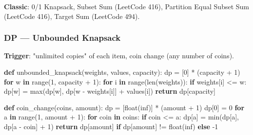 \documentclass[11pt]{article}
\newenvironment{Shaded}{\begin{snugshade}}{\end{snugshade}}
\newcommand{\BuiltInTok}[1]{\textcolor[rgb]{0.50,0.55,0.55}{#1}}
\newcommand{\ControlFlowTok}[1]{\textcolor[rgb]{0.99,0.74,0.29}{\textbf{#1}}}
\newcommand{\DecValTok}[1]{\textcolor[rgb]{0.96,0.45,0.00}{#1}}
\newcommand{\KeywordTok}[1]{\textcolor[rgb]{0.81,0.81,0.76}{\textbf{#1}}}
\newcommand{\NormalTok}[1]{\textcolor[rgb]{0.81,0.81,0.76}{#1}}
\newcommand{\OperatorTok}[1]{\textcolor[rgb]{0.81,0.81,0.76}{#1}}
\newcommand{\StringTok}[1]{\textcolor[rgb]{0.96,0.31,0.31}{#1}}
\begin{document}
\textbf{Classic}: 0/1 Knapsack, Subset Sum (LeetCode 416), Partition Equal Subset Sum (LeetCode 416), Target Sum (LeetCode 494).

\subsubsection{DP --- Unbounded Knapsack}\label{dp--unbounded-knapsack}

\textbf{Trigger}: "unlimited copies" of each item, coin change (any number of coins).


\begin{Shaded}
\begin{Highlighting}[]
\KeywordTok{def}\NormalTok{ unbounded\_knapsack(weights, values, capacity):}
\NormalTok{    dp }\OperatorTok{=}\NormalTok{ [}\DecValTok{0}\NormalTok{] }\OperatorTok{*}\NormalTok{ (capacity }\OperatorTok{+} \DecValTok{1}\NormalTok{)}
    \ControlFlowTok{for}\NormalTok{ w }\KeywordTok{in} \BuiltInTok{range}\NormalTok{(}\DecValTok{1}\NormalTok{, capacity }\OperatorTok{+} \DecValTok{1}\NormalTok{):}
        \ControlFlowTok{for}\NormalTok{ i }\KeywordTok{in} \BuiltInTok{range}\NormalTok{(}\BuiltInTok{len}\NormalTok{(weights)):}
            \ControlFlowTok{if}\NormalTok{ weights[i] }\OperatorTok{\textless{}=}\NormalTok{ w:}
\NormalTok{                dp[w] }\OperatorTok{=} \BuiltInTok{max}\NormalTok{(dp[w], dp[w }\OperatorTok{{-}}\NormalTok{ weights[i]] }\OperatorTok{+}\NormalTok{ values[i])}
    \ControlFlowTok{return}\NormalTok{ dp[capacity]}

\KeywordTok{def}\NormalTok{ coin\_change(coins, amount):}
\NormalTok{    dp }\OperatorTok{=}\NormalTok{ [}\BuiltInTok{float}\NormalTok{(}\StringTok{\textquotesingle{}inf\textquotesingle{}}\NormalTok{)] }\OperatorTok{*}\NormalTok{ (amount }\OperatorTok{+} \DecValTok{1}\NormalTok{)}
\NormalTok{    dp[}\DecValTok{0}\NormalTok{] }\OperatorTok{=} \DecValTok{0}
    \ControlFlowTok{for}\NormalTok{ a }\KeywordTok{in} \BuiltInTok{range}\NormalTok{(}\DecValTok{1}\NormalTok{, amount }\OperatorTok{+} \DecValTok{1}\NormalTok{):}
        \ControlFlowTok{for}\NormalTok{ coin }\KeywordTok{in}\NormalTok{ coins:}
            \ControlFlowTok{if}\NormalTok{ coin }\OperatorTok{\textless{}=}\NormalTok{ a:}
\NormalTok{                dp[a] }\OperatorTok{=} \BuiltInTok{min}\NormalTok{(dp[a], dp[a }\OperatorTok{{-}}\NormalTok{ coin] }\OperatorTok{+} \DecValTok{1}\NormalTok{)}
    \ControlFlowTok{return}\NormalTok{ dp[amount] }\ControlFlowTok{if}\NormalTok{ dp[amount] }\OperatorTok{!=} \BuiltInTok{float}\NormalTok{(}\StringTok{\textquotesingle{}inf\textquotesingle{}}\NormalTok{) }\ControlFlowTok{else} \OperatorTok{{-}}\DecValTok{1}
\end{Highlighting}
\end{Shaded}
\end{document}
